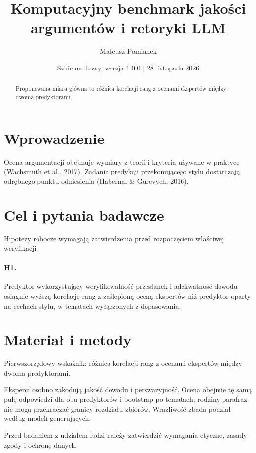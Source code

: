 \documentclass[11pt,a4paper]{article}
\title{Komputacyjny benchmark jakości argumentów i retoryki LLM}
\author{Mateusz Pomianek}
\date{Szkic naukowy, wersja 1.0.0 | 28 listopada 2026}
\begin{document}
\maketitle

\begin{abstract}

Proponowana miara główna to różnica korelacji rang z ocenami ekspertów między dwoma predyktorami.

\end{abstract}

\section{Wprowadzenie}

Ocena argumentacji obejmuje wymiary z teorii i kryteria używane w praktyce (Wachsmuth et al., 2017). Zadania predykcji przekonującego stylu dostarczają odrębnego punktu odniesienia (Habernal \& Gurevych, 2016).

\section{Cel i pytania badawcze}

Hipotezy robocze wymagają zatwierdzenia przed rozpoczęciem właściwej weryfikacji.

\paragraph{H1.} Predyktor wykorzystujący weryfikowalność przesłanek i adekwatność dowodu osiągnie wyższą korelację rang z zaślepioną oceną ekspertów niż predyktor oparty na cechach stylu, w tematach wyłączonych z dopasowania.

\section{Materiał i metody}

Pierwszorzędowy wskaźnik: różnica korelacji rang z ocenami ekspertów między dwoma predyktorami.

Eksperci osobno zakodują jakość dowodu i perswazyjność. Ocena obejmie tę samą pulę odpowiedzi dla obu predyktorów i bootstrap po tematach; rodziny parafraz nie mogą przekraczać granicy rozdziału zbiorów. Wrażliwość zbada podział według modeli generujących.

Przed badaniem z udziałem ludzi należy zatwierdzić wymagania etyczne, zasady zgody i ochronę danych.
\end{document}
